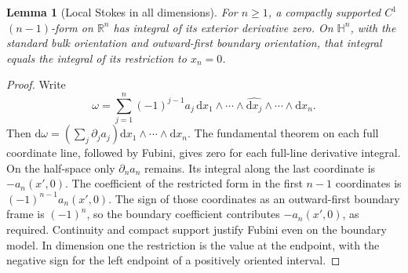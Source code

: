 \documentclass[11pt,oneside,openany]{book}
\newtheorem{lemma}[theorem]{Lemma}
\theoremstyle{definition}
\theoremstyle{remark}
\newcommand{\R}{\mathbb R}
\newcommand{\HH}{\mathbb H}
\newcommand{\dd}{\mathrm d}
\begin{document}
\begin{lemma}[Local Stokes in all dimensions]
\label{p104:M10.03}
For \(n\geq1\), a compactly supported \(C^1\) \((n-1)\)-form on
\(\R^n\) has integral of its exterior derivative zero. On \(\HH^n\),
with the standard bulk orientation and outward-first boundary
orientation, that integral equals the integral of its restriction to
\(x_n=0\).
\end{lemma}
\begin{proof}
Write
\[
 \omega=\sum_{j=1}^n(-1)^{j-1}a_j\,
     \dd x_1\wedge\cdots\wedge\widehat{\dd x_j}\wedge\cdots\wedge\dd x_n .
\]
Then \(\dd\omega=(\sum_j\partial_j a_j)\dd x_1\wedge\cdots\wedge\dd x_n\).
The fundamental theorem on each full coordinate line, followed by Fubini,
gives zero for each full-line derivative integral. On the half-space
only \(\partial_n a_n\) remains. Its integral along the last coordinate
is \(-a_n(x',0)\). The coefficient of the restricted form in the first
\(n-1\) coordinates is \((-1)^{n-1}a_n(x',0)\). The sign of those
coordinates as an outward-first boundary frame is \((-1)^n\), so the
boundary coefficient contributes \(-a_n(x',0)\), as required.
Continuity and compact support justify Fubini even on the boundary
model. In dimension one the restriction is the value at the endpoint,
with the negative sign for the left endpoint of a positively oriented
interval.
\end{proof}
\end{document}
